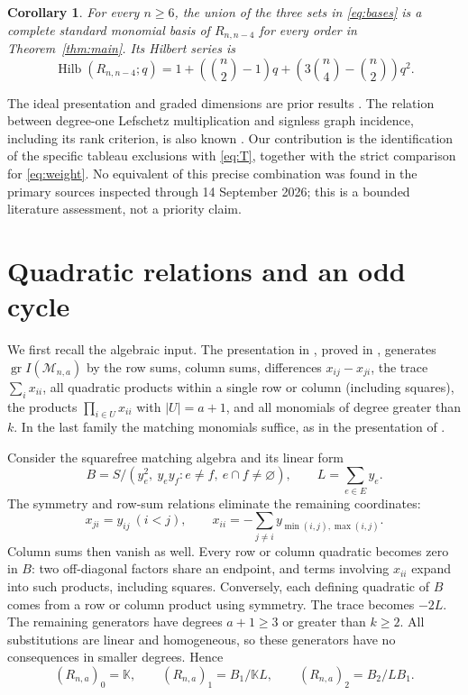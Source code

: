 \documentclass[11pt,a4paper]{article}
\newtheorem{corollary}[theorem]{Corollary}
\newcommand{\kk}{\mathbb{K}}
\newcommand{\Mn}{\mathcal{M}_{n,a}}
\DeclareMathOperator{\gr}{gr}
\DeclareMathOperator{\Hilb}{Hilb}
\begin{document}
\begin{corollary}\label{cor:two}
For every $n\geq6$, the union of the three sets in \eqref{eq:bases}
is a complete standard monomial basis of $R_{n,n-4}$ for every order in
Theorem~\ref{thm:main}. Its Hilbert series is
\begin{equation}\label{eq:hilbert}
 \Hilb(R_{n,n-4};q)
 =1+\left(\binom n2-1\right)q
    +\left(3\binom n4-\binom n2\right)q^2.
\end{equation}
\end{corollary}

The ideal presentation and graded dimensions are prior results
\cite{LMRZ,ZhuPositive,ZhuRook}. The relation between degree-one
Lefschetz multiplication and signless graph incidence, including its
rank criterion, is also known \cite[Proposition 3.1, Lemma 3.2 and
Theorem 3.3]{DaoNair}. Our contribution is the identification of the
specific tableau exclusions with \eqref{eq:T}, together with the strict
comparison for \eqref{eq:weight}. No equivalent of this precise combination
was found in the primary sources inspected through 14 September 2026;
this is a bounded literature assessment, not a priority claim.

\section{Quadratic relations and an odd cycle}\label{sec:graph}

We first recall the algebraic input. The presentation in
\cite[Section 2.5]{ZhuPositive}, proved in
\cite[Appendix A, Proposition A.7]{ZhuRook}, generates $\gr I(\Mn)$ by
the row sums, column sums, differences $x_{ij}-x_{ji}$, the trace
$\sum_i x_{ii}$, all quadratic products within a single row or column
(including squares), the products $\prod_{i\in U}x_{ii}$ with $|U|=a+1$,
and all monomials of degree greater than $k$. In the last family the
matching monomials suffice, as in the presentation of \cite{ZhuRook}.

Consider the squarefree matching algebra and its linear form
\begin{equation}\label{eq:B}
 B=S/(y_e^2,\ y_e y_f:e\ne f,\ e\cap f\ne\varnothing),
 \qquad L=\sum_{e\in E}y_e.
\end{equation}
The symmetry and row-sum relations eliminate the remaining coordinates:
\begin{equation}\label{eq:elimination}
 x_{ji}=y_{ij}\ (i<j),\qquad
 x_{ii}=-\sum_{j\ne i}y_{\min(i,j),\max(i,j)}.
\end{equation}
Column sums then vanish as well. Every row or column quadratic becomes
zero in $B$: two off-diagonal factors share an endpoint, and terms
involving $x_{ii}$ expand into such products, including squares.
Conversely, each defining quadratic of $B$ comes from a row or column
product using symmetry. The trace becomes $-2L$.
The remaining generators have degrees $a+1\geq3$ or greater than
$k\geq2$. All substitutions are linear and homogeneous, so these
generators have no consequences in smaller degrees. Hence
\begin{equation}\label{eq:low}
 (R_{n,a})_0=\kk,\qquad
 (R_{n,a})_1=B_1/\kk L,\qquad
 (R_{n,a})_2=B_2/LB_1.
\end{equation}
\end{document}
